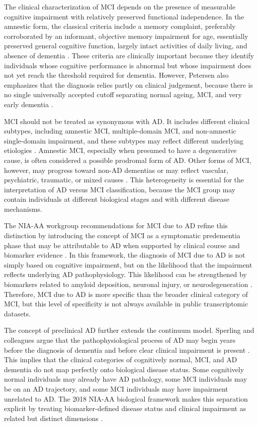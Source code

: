 The clinical characterization of MCI depends on the presence of measurable cognitive impairment with relatively preserved functional independence. In the amnestic form, the classical criteria include a memory complaint, preferably corroborated by an informant, objective memory impairment for age, essentially preserved general cognitive function, largely intact activities of daily living, and absence of dementia \citep{petersen2004mci}. These criteria are clinically important because they identify individuals whose cognitive performance is abnormal but whose impairment does not yet reach the threshold required for dementia. However, Petersen also emphasizes that the diagnosis relies partly on clinical judgement, because there is no single universally accepted cutoff separating normal ageing, MCI, and very early dementia \citep{petersen2004mci}.

MCI should not be treated as synonymous with AD. It includes different clinical subtypes, including amnestic MCI, multiple-domain MCI, and non-amnestic single-domain impairment, and these subtypes may reflect different underlying etiologies \citep{petersen2004mci}. Amnestic MCI, especially when presumed to have a degenerative cause, is often considered a possible prodromal form of AD. Other forms of MCI, however, may progress toward non-AD dementias or may reflect vascular, psychiatric, traumatic, or mixed causes \citep{petersen2004mci}. This heterogeneity is essential for the interpretation of AD versus MCI classification, because the MCI group may contain individuals at different biological stages and with different disease mechanisms.

The NIA-AA workgroup recommendations for MCI due to AD refine this distinction by introducing the concept of MCI as a symptomatic predementia phase that may be attributable to AD when supported by clinical course and biomarker evidence \citep{albert2011diagnosis}. In this framework, the diagnosis of MCI due to AD is not simply based on cognitive impairment, but on the likelihood that the impairment reflects underlying AD pathophysiology. This likelihood can be strengthened by biomarkers related to amyloid deposition, neuronal injury, or neurodegeneration \citep{albert2011diagnosis}. Therefore, MCI due to AD is more specific than the broader clinical category of MCI, but this level of specificity is not always available in public transcriptomic datasets.

The concept of preclinical AD further extends the continuum model. Sperling and colleagues argue that the pathophysiological process of AD may begin years before the diagnosis of dementia and before clear clinical impairment is present \citep{sperling2011preclinical}. This implies that the clinical categories of cognitively normal, MCI, and AD dementia do not map perfectly onto biological disease status. Some cognitively normal individuals may already have AD pathology, some MCI individuals may be on an AD trajectory, and some MCI individuals may have impairment unrelated to AD. The 2018 NIA-AA biological framework makes this separation explicit by treating biomarker-defined disease status and clinical impairment as related but distinct dimensions \citep{jack2018nia}.

